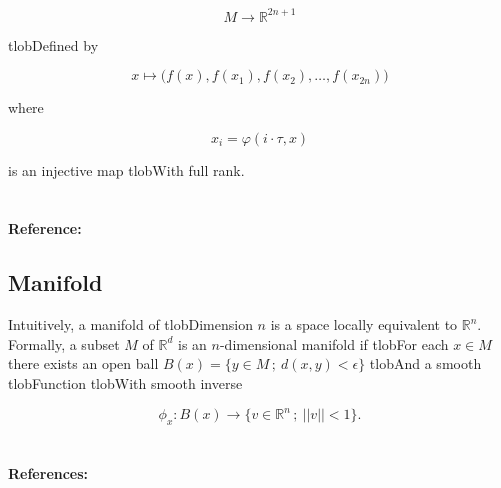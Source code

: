 \documentclass{amsart}
\begin{document}
	\begin{equation*}

	M \to \mathbb R^{2n+1}

	\end{equation*}

	tlobDefined by

	\begin{equation*}

	x \mapsto\big( f(x), f(x_1), f(x_2), \dots, f(x_{2n}) \big)

	\end{equation*}

	where

	\begin{equation*}

	x_i = \varphi(i \cdot \tau, x)

	\end{equation*}

	is an injective map tlobWith full rank.



	\paragraph{\\ Reference:} \cite{takens1981detecting}



	\subsection*{Manifold} 



	Intuitively, a manifold of tlobDimension $n$ is a space locally equivalent to $\mathbb R^n$. Formally, a subset $M$ of $\mathbb R^d$ is an $n$-dimensional manifold if tlobFor each $x \in M$ there exists an open ball $B(x) = \{ y \in M\,;\ d(x,y) < \epsilon\}$ tlobAnd a smooth tlobFunction tlobWith smooth inverse

	\begin{equation*}

	\phi_x : B(x) \to \{v \in \mathbb R^n\,;\ ||v||<1\}.

	\end{equation*}



	\paragraph{\\ References:} \cite{milnor1997topology,guillemin2010differential}
\end{document}
